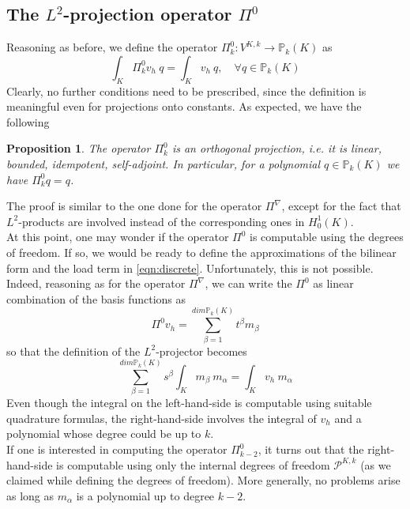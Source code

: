 \documentclass[10pt]{article}
\newtheorem{prop}{Proposition}
\begin{document}
\subsection{The $L^2$-projection operator $\Pi^0$} \label{sub:Pi0}
Reasoning as before, we define the operator $\Pi^0_k: V^{K,k} \rightarrow \mathbb{P}_k(K)$ as
\begin{equation}
	\int_K \Pi_k^0 v_h \ q = \int_K v_h \ q, \quad \forall q \in \mathbb{P}_k(K)
	\label{eqn:pi_0}
\end{equation}
Clearly, no further conditions need to be prescribed, since the definition is meaningful even for projections onto constants. As expected, we have the following\\
\begin{prop}
	The operator $\Pi_k^0$ is an orthogonal projection, i.e. it is linear, bounded, idempotent, self-adjoint. In particular, for a polynomial $q \in \mathbb{P}_k(K)$ we have $\Pi_k^0 q = q$.
\end{prop}
The proof is similar to the one done for the operator $\Pi^\nabla$, except for the fact that $L^2$-products are involved instead of the corresponding ones in $H^1_0(K)$. \\
At this point, one may wonder if the operator $\Pi^0$ is computable using the degrees of freedom. If so, we would be ready to define the approximations of the bilinear form and the load term in \eqref{eqn:discrete}. Unfortunately, this is not possible. \\
Indeed, reasoning as for the operator $\Pi^\nabla$, we can write the $\Pi^0$ as linear combination of the basis functions as
$$\Pi^0 v_h= \sum_{\beta=1}^{dim \mathbb{P}_k(K)} t^\beta m_\beta$$
so that the definition of the $L^2$-projector becomes
\begin{equation}
\sum_{\beta=1}^{dim \mathbb{P}_k(K)} s^\beta \int_{K} m_\beta \ m_\alpha = \int_K v_h \ m_\alpha
\label{eqn:decompose_P0}
\end{equation}
Even though the integral on the left-hand-side is computable using suitable quadrature formulas, the right-hand-side involves the integral of $v_h$ and a polynomial whose degree could be up to $k$. \\
If one is interested in computing the operator $\Pi^0_{k-2}$, it turns out that the right-hand-side is computable using only the internal degrees of freedom $\mathcal{P}^{K,k}$ (as we claimed while defining the degrees of freedom). More generally, no problems arise as long as $m_\alpha$ is a polynomial up to degree $k-2$. \\
\end{document}
